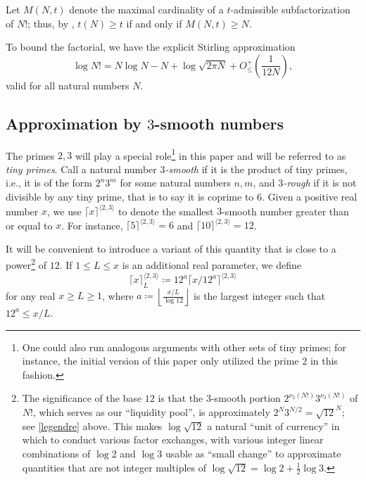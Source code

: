 \documentclass[12pt,a4paper,reqno]{amsart}
\numberwithin{equation}{section}
\theoremstyle{plain}
\theoremstyle{definition}
\begin{document}
Let $M(N,t)$ denote the maximal cardinality of a $t$-admissible subfactorization of $N!$; thus, by , $t(N) \geq t$ if and only if $M(N,t) \geq N$. 

To bound the factorial, we have the explicit Stirling approximation \cite{robbins}
\begin{equation}\label{stirling}
\log N! = N \log N - N + \log \sqrt{2\pi N} + O_\leq^+\left(\frac{1}{12N}\right),
\end{equation}
valid for all natural numbers $N$. 

\subsection{Approximation by \texorpdfstring{$3$}{3}-smooth numbers} 

The primes $2,3$ will play a special role\footnote{One could also run analogous arguments with other sets of tiny primes; for instance, the initial version \cite{tao} of this paper only utilized the prime $2$ in this fashion.} in this paper and will be referred to as \emph{tiny primes}. 
Call a natural number \emph{$3$-smooth} if it is the product of tiny primes, i.e., it is of the form $2^n 3^m$ for some natural numbers $n,m$, and \emph{$3$-rough} if it is not divisible by any tiny prime, that is to say it is coprime to $6$.  Given a positive real number $x$, we use $\lceil x \rceil^{\langle 2,3 \rangle}$ to denote the smallest $3$-smooth number greater than or equal to $x$.  For instance, $\lceil 5 \rceil^{\langle 2,3 \rangle} = 6$ and $\lceil 10 \rceil^{\langle 2,3 \rangle} = 12$.  

It will be convenient to introduce a variant of this quantity that is close to a power\footnote{The significance of the base $12$ is that the $3$-smooth portion $2^{\nu_2(N!)} 3^{\nu_3(N!)}$ of $N!$, which serves as our ``liquidity pool'', is approximately $2^N 3^{N/2} = \sqrt{12}^{N}$; see \eqref{legendre} above.  This makes $\log \sqrt{12}$ a natural ``unit of currency'' in which to conduct various factor exchanges, with various integer linear combinations of $\log 2$ and $\log 3$ usable as ``small change'' to approximate quantities that are not integer multiples of $\log \sqrt{12} = \log 2 + \frac{1}{2} \log 3$.} of $12$.  If $1 \leq L \leq x$ is an additional real parameter, we define
\begin{equation}\label{fancy-kappa-def}
  \lceil x \rceil^{\langle 2,3\rangle}_L \coloneqq 12^a \lceil x/12^a \rceil^{\langle 2,3 \rangle}
\end{equation}
for any real $x \geq L \geq 1$, where $a \coloneqq \left\lfloor \frac{x/L}{\log 12} \right\rfloor$ is the largest integer such that $12^a \leq x/L$.
\end{document}
